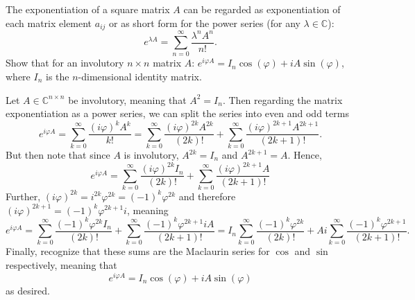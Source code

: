 \documentclass{../../../kin_math}
\begin{document}
\begin{questions}
  \question The exponentiation of a square matrix $A$ can be regarded as exponentiation of each matrix element $a_{ij}$ or as short form for the power series (for any $\lambda \in \mathbb{C}$):
  \begin{equation*}
    e^{\lambda A} = \sum_{n = 0}^\infty \frac{\lambda^n A^n}{n!}.
  \end{equation*}
  Show that for an involutory $n \times n$ matrix $A$: $e^{i \varphi A} = I_n \cos(\varphi) + iA \sin(\varphi)$, where $I_n$ is the $n$-dimensional identity matrix.
  \begin{solution}
    Let $A \in \mathbb{C}^{n \times n}$ be involutory, meaning that $A^2 = I_n$. Then regarding the matrix exponentiation as a power series, we can split the series into even and odd terms
    \begin{equation*}
      e^{i \varphi A} = \sum_{k = 0}^\infty \frac{(i \varphi)^k A^k}{k!} = \sum_{k = 0}^\infty \frac{(i \varphi)^{2k} A^{2k}}{(2k)!} + \sum_{k = 0}^\infty \frac{(i \varphi)^{2k + 1} A^{2k + 1}}{(2k + 1)!}.
    \end{equation*}
    But then note that since $A$ is involutory, $A^{2k} = I_n$ and $A^{2k + 1} = A$. Hence,
    \begin{equation*}
      e^{i \varphi A} = \sum_{k = 0}^\infty \frac{(i \varphi)^{2k} I_n}{(2k)!} + \sum_{k = 0}^\infty \frac{(i \varphi)^{2k + 1} A}{(2k + 1)!}
    \end{equation*}
    Further, $(i \varphi)^{2k} = i^{2k} \varphi^{2k} = (-1)^k \varphi^{2k}$ and therefore $(i \varphi)^{2k + 1} = (-1)^k \varphi^{2k + 1} i$, meaning
    \begin{equation*}
      e^{i \varphi A} = \sum_{k = 0}^\infty \frac{(-1)^k \varphi^{2k} I_n}{(2k)!} + \sum_{k = 0}^\infty \frac{(-1)^k \varphi^{2k + 1} i A}{(2k + 1)!} = I_n\sum_{k = 0}^\infty \frac{(-1)^k \varphi^{2k}}{(2k)!} + Ai \sum_{k = 0}^\infty \frac{(-1)^k \varphi^{2k + 1}}{(2k + 1)!}.
    \end{equation*}
    Finally, recognize that these sums are the Maclaurin series for $\cos$ and $\sin$ respectively, meaning that
    \begin{equation*}
      e^{i \varphi A} = I_n \cos(\varphi) + iA \sin(\varphi)
    \end{equation*}
    as desired.
  \end{solution}


\end{questions}
\end{document}
